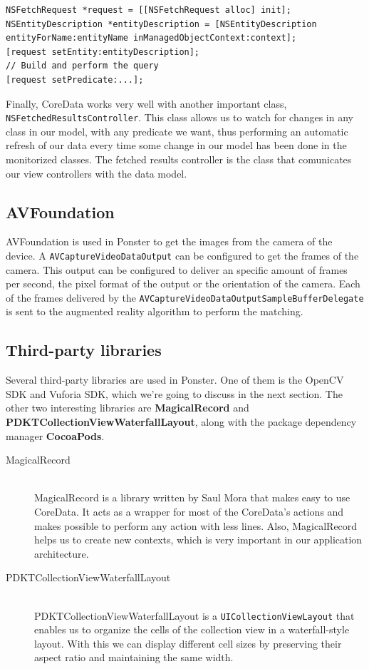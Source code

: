 \begin{verbatim}
NSFetchRequest *request = [[NSFetchRequest alloc] init];
NSEntityDescription *entityDescription = [NSEntityDescription
entityForName:entityName inManagedObjectContext:context];
[request setEntity:entityDescription];
// Build and perform the query
[request setPredicate:...];
\end{verbatim}

Finally, CoreData works very well with another important class,
\texttt{NSFetchedResultsController}. This class allows us to watch for changes in
any class in our model, with any predicate we want, thus performing an automatic
refresh of our data every time some change in our model has been done in the
monitorized classes. The fetched results controller is the class that comunicates
our view controllers with the data model.

\subsection{AVFoundation}
AVFoundation is used in Ponster to get the images from the camera of the device. A
\texttt{AVCaptureVideoDataOutput} can be configured to get the frames of the
camera. This output can be configured to deliver an specific amount of frames per
second, the pixel format of the output or the orientation of the camera. Each of the
frames delivered by the \texttt{AVCaptureVideoDataOutputSampleBufferDelegate} is
sent to the augmented reality algorithm to perform the matching.

\subsection{Third-party libraries}
Several third-party libraries are used in Ponster. One of them is the OpenCV SDK and
Vuforia SDK, which we're going to discuss in the next section. The other two
interesting libraries are \textbf{MagicalRecord} and
\textbf{PDKTCollectionViewWaterfallLayout}, along with the package dependency
manager \textbf{CocoaPods}.

\begin{description}
\item [MagicalRecord] \hfill \\
MagicalRecord\cite{gh:mr} is a library written by Saul Mora that makes easy to use
CoreData. It acts as a wrapper for most of the CoreData's actions and makes possible
to perform any action with less lines. Also, MagicalRecord helps us to create new
contexts, which is very important in our application architecture.
\item [PDKTCollectionViewWaterfallLayout] \hfill \\
PDKTCollectionViewWaterfallLayout is a \texttt{UICollectionViewLayout} that enables
us to organize the cells of the collection view in a waterfall-style layout. With
this we can display different cell sizes by preserving their aspect ratio and
maintaining the same width.
\end{description}

